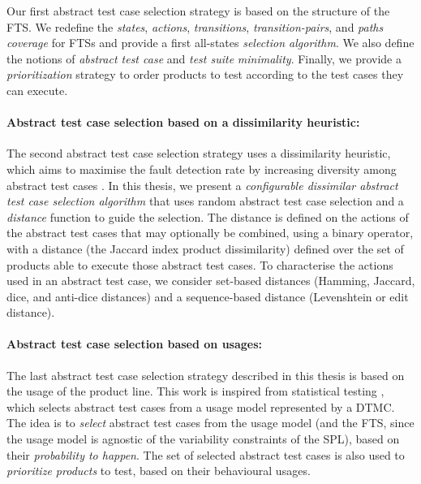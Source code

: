 Our first abstract test case selection strategy is based on the structure of the \gls{FTS}. We redefine the \emph{states}, \emph{actions}, \emph{transitions}, \emph{transition-pairs}, and \emph{paths} \emph{coverage} for FTSs and provide a first all-states \emph{selection algorithm}. We also define the notions of \emph{abstract test case} and \emph{test suite} \emph{minimality}. Finally, we provide a \emph{prioritization} strategy to order products to test according to the test cases they can execute. 


\paragraph{Abstract test case selection based on a dissimilarity heuristic:}

The second abstract test case selection strategy uses a dissimilarity heuristic, which aims to maximise the fault detection rate by increasing diversity among abstract test cases \cite{Cartaxo2011,Hemmati2013}. 
In this thesis, we present a \emph{configurable dissimilar abstract test case selection algorithm} that uses random abstract test case selection and a \emph{distance} function to guide the selection. The distance is defined on the actions of the abstract test cases that may optionally be combined, using a binary operator, with a distance (the Jaccard index product dissimilarity) defined over the set of products able to execute those abstract test cases. To characterise the actions used in an abstract test case, we consider set-based distances (Hamming, Jaccard, dice, and anti-dice distances) and a sequence-based distance (Levenshtein or edit distance).


\paragraph{Abstract test case selection based on usages:}

The last abstract test case selection strategy described in this thesis is based on the usage of the product line.  This work is inspired from statistical testing \cite{Whittaker1994}, which selects abstract test cases from a \gls{usage model} represented by a \gls{DTMC}. The idea is to \emph{select} abstract test cases from the usage model (and the FTS, since the usage model is agnostic of the variability constraints of the SPL), based on their \emph{probability to happen}. The set of selected abstract test cases is also used to \emph{prioritize products} to test, based on their behavioural usages.


